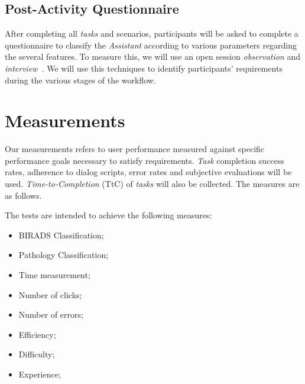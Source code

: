 

\subsection{Post-Activity Questionnaire}

After completing all \textit{tasks} and scenarios, participants will be asked to complete a questionnaire to classify the \textit{Assistant} according to various parameters regarding the several features. To measure this, we will use an open session \textit{observation} and \textit{interview}~\cite{carayon2015systematic}. We will use this techniques to identify participants' requirements during the various stages of the workflow.













\section{Measurements}
\label{sec:sec020}

Our measurements refers to user performance measured against specific performance goals necessary to satisfy requirements. \textit{Task} completion success rates, adherence to dialog scripts, error rates and subjective evaluations will be used. \textit{Time-to-Completion} (TtC) of \textit{tasks} will also be collected. The measures are as follows.

\hfill


The tests are intended to achieve the following measures:


\hfill

\begin{itemize}
\item BIRADS Classification;
\item Pathology Classification;
\item Time measurement;
\item Number of clicks;
\item Number of errors;
\item Efficiency;
\item Difficulty;
\item Experience;
\end{itemize}

